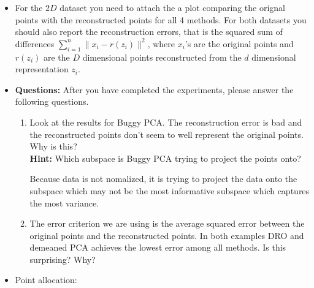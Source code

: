 \documentclass[a4paper]{article}
\theoremstyle{definition}
\newenvironment{soln}{
    \leavevmode\color{blue}\ignorespaces
}{}
\begin{document}
\begin{itemize}
	\item
	      For the $2D$ dataset you need to attach the a
	      plot comparing the orignal points with the reconstructed points for all 4
	      methods.
	      For both datasets you should also report the reconstruction errors, that is the squared sum of
	      differences $\sum_{i=1}^n \|x_i - r(z_i)\|^2$,
	      where $x_i$'s are the original points and $r(z_i)$ are the $D$ dimensional points
	      reconstructed from the
	      $d$ dimensional representation $z_i$.

	\item \textbf{Questions:} After you have completed the experiments, please answer the following questions.
	      \begin{enumerate}
		      \item Look at the results for Buggy PCA. The reconstruction error is bad and the
		            reconstructed points don't seem to well represent the original points. Why is
		            this? \\
		            \textbf{Hint: } Which subspace is Buggy PCA trying to project the points
		            onto?

		            \begin{soln}
			            Because data is not nomalized, it is trying to project the data onto the subspace which may not be the most informative subspace which captures the most variance.
		            \end{soln}

		      \item The error criterion we are using is the average squared error
		            between the original points and the reconstructed points.
		            In both examples DRO and demeaned PCA achieves the lowest error among all
		            methods.
		            Is this surprising? Why?
	      \end{enumerate}

	\item Point allocation:
\end{itemize}
\end{document}

